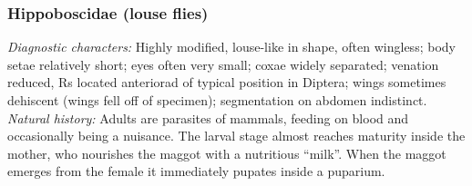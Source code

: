 \documentclass[letterpaper, 11pt]{article}
\begin{document}
\subsubsection{Hippoboscidae (louse flies)}
\noindent{}\textit{Diagnostic characters:} Highly modified, louse-like in shape, often wingless; body setae relatively short; eyes often very small; coxae widely separated; venation reduced, Rs located anteriorad of typical position in Diptera; wings sometimes dehiscent (wings fell off of specimen); segmentation on abdomen indistinct.\\

\noindent{}\textit{Natural history:} Adults are parasites of mammals, feeding on blood and occasionally being a nuisance. The larval stage almost reaches maturity inside the mother, who nourishes the maggot with a nutritious ``milk''. When the maggot emerges from the female it immediately pupates inside a puparium.\\
\end{document}
